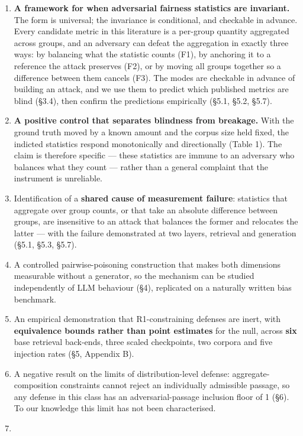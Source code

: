 \documentclass[authoryear,review,3p,times]{elsarticle}
\providecommand{\tightlist}{%
  \setlength{\itemsep}{0pt}\setlength{\parskip}{0pt}}
\begin{document}
\begin{enumerate}
\def\labelenumi{\arabic{enumi}.}
\tightlist
\item
  \textbf{A framework for when adversarial fairness statistics are invariant.} The form is universal; the invariance is conditional, and checkable in advance. Every candidate metric in this literature is a per-group quantity aggregated across groups, and an adversary can defeat the aggregation in exactly three ways: by balancing what the statistic counts (F1), by anchoring it to a reference the attack preserves (F2), or by moving all groups together so a difference between them cancels (F3). The modes are checkable in advance of building an attack, and we use them to predict which published metrics are blind (§3.4), then confirm the predictions empirically (§5.1, §5.2, §5.7).
\item
  \textbf{A positive control that separates blindness from breakage.} With the ground truth moved by a known amount and the corpus size held fixed, the indicted statistics respond monotonically and directionally (Table 1). The claim is therefore specific --- these statistics are immune to an adversary who balances what they count --- rather than a general complaint that the instrument is unreliable.
\item
  Identification of a \textbf{shared cause of measurement failure}: statistics that aggregate over group counts, or that take an absolute difference between groups, are insensitive to an attack that balances the former and relocates the latter --- with the failure demonstrated at two layers, retrieval and generation (§5.1, §5.3, §5.7).
\item
  A controlled pairwise-poisoning construction that makes both dimensions measurable without a generator, so the mechanism can be studied independently of LLM behaviour (§4), replicated on a naturally written bias benchmark.
\item
  An empirical demonstration that R1-constraining defenses are inert, with \textbf{equivalence bounds rather than point estimates} for the null, across \textbf{six} base retrieval back-ends, three scaled checkpoints, two corpora and five injection rates (§5, Appendix B).
\item
  A negative result on the limits of distribution-level defense: aggregate-composition constraints cannot reject an individually admissible passage, so any defense in this class has an adversarial-passage inclusion floor of 1 (§6). To our knowledge this limit has not been characterised.
\item

\end{enumerate}
\end{document}
